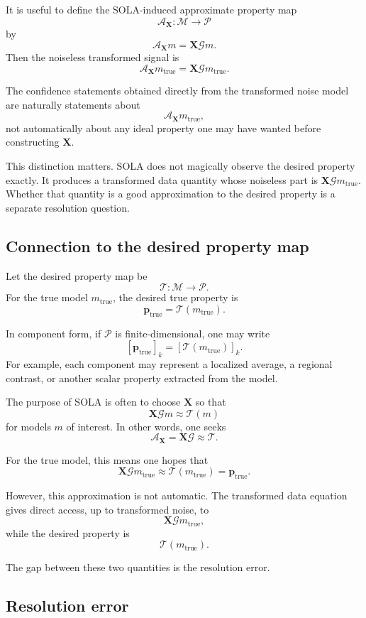 \documentclass[11pt]{article}
\newcommand{\Mspace}{\mathcal M}
\newcommand{\Pspace}{\mathcal P}
\newcommand{\ptrue}{\mathbf p_{\mathrm{true}}}
\newcommand{\G}{\mathcal G}
\newcommand{\Tau}{\mathcal T}
\newcommand{\X}{\mathbf X}
\newcommand{\A}{\mathcal A}
\begin{document}
It is useful to define the SOLA-induced approximate property map
\[
    \A_{\X}:\Mspace\to\Pspace
\]
by
\[
    \A_{\X}m
    =
    \X\G m.
\]
Then the noiseless transformed signal is
\[
    \A_{\X}m_{\mathrm{true}}
    =
    \X\G m_{\mathrm{true}}.
\]

The confidence statements obtained directly from the transformed noise model are naturally statements about
\[
    \A_{\X}m_{\mathrm{true}},
\]
not automatically about any ideal property one may have wanted before constructing \(\X\).

This distinction matters. SOLA does not magically observe the desired property exactly. It produces a transformed data quantity whose noiseless part is \(\X\G m_{\mathrm{true}}\). Whether that quantity is a good approximation to the desired property is a separate resolution question.

\subsection{Connection to the desired property map}

Let the desired property map be
\[
    \Tau:\Mspace\to\Pspace.
\]
For the true model \(m_{\mathrm{true}}\), the desired true property is
\[
    \ptrue
    =
    \Tau(m_{\mathrm{true}}).
\]

In component form, if \(\Pspace\) is finite-dimensional, one may write
\[
    [\ptrue]_k
    =
    [\Tau(m_{\mathrm{true}})]_k.
\]
For example, each component may represent a localized average, a regional contrast, or another scalar property extracted from the model.

The purpose of SOLA is often to choose \(\X\) so that
\[
    \X\G m
    \approx
    \Tau(m)
\]
for models \(m\) of interest. In other words, one seeks
\[
    \A_{\X}
    =
    \X\G
    \approx
    \Tau.
\]

For the true model, this means one hopes that
\[
    \X\G m_{\mathrm{true}}
    \approx
    \Tau(m_{\mathrm{true}})
    =
    \ptrue.
\]

However, this approximation is not automatic. The transformed data equation gives direct access, up to transformed noise, to
\[
    \X\G m_{\mathrm{true}},
\]
while the desired property is
\[
    \Tau(m_{\mathrm{true}}).
\]

The gap between these two quantities is the resolution error.

\subsection{Resolution error}
\end{document}
